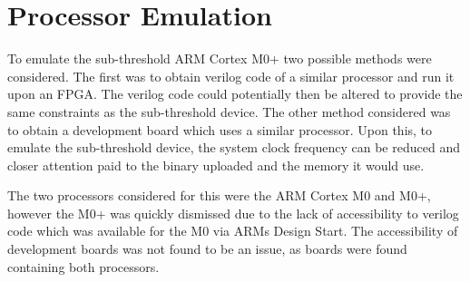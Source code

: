 \section{Processor Emulation}

To emulate the sub-threshold ARM Cortex M0+ two possible methods were considered. The first was to obtain verilog code of a similar processor and run it upon an FPGA. The verilog code could potentially then be altered to provide the same constraints as the sub-threshold device. The other method considered was to obtain a development board which uses a similar processor. Upon this, to emulate the sub-threshold device, the system clock frequency can be reduced and closer attention paid to the binary uploaded and the memory it would use.

The two processors considered for this were the ARM Cortex M0 and M0+, however the M0+ was quickly dismissed due to the lack of accessibility to verilog code which was available for the M0 via ARMs Design Start. The accessibility of development boards was not found to be an issue, as boards were found containing both processors. 



